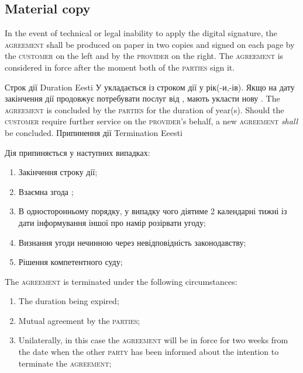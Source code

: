 \begin{Form}
\begin{paracol}{3}
{        \subsection{Material copy}
        In the event of technical or legal inability to apply the digital signature, the \textsc{agreement} shall be produced on paper in two copies and signed on each page by the \textsc{customer} on the left and by the \textsc{provider} on the right. The \textsc{agreement} is considered in force after the moment both of the \textsc{parties} sign it.}
        {}
      \clause
        {Строк дії}
        {Duration}
        {Eesti}
        {У укладається  із строком дії у  рік(-и,-ів). Якщо  на дату закінчення дії  продовжує потребувати послуг від ,  мають укласти нову .}
        {The \textsc{agreement} is concluded by the \textsc{parties} for the duration of  year(s). Should the \textsc{customer} require further service on the \textsc{provider}'s behalf, a new \textsc{agreement} \emph{shall} be concluded.}
        {}
      \clause
        {Припинення дії}
        {Termination}
        {Eeesti}
        {Дія  припиняється у наступних випадках:
        \begin{enumerate}
          \item Закінчення строку дії;
          \item Взаємна згода ;
          \item В односторонньому порядку, у випадку чого  діятиме 2 календарні тижні із дати інформування іншої  про намір розірвати угоду; 
          \item Визнання угоди нечинною через невідповідність законодавству;
          \item Рішення компетентного суду;
        \end{enumerate}}
        {The \textsc{agreement} is terminated under the following circumstances:
        \begin{enumerate}
          \item The duration being expired;
          \item Mutual agreement by the \textsc{parties};
          \item Unilaterally, in this case the \textsc{agreement} will be in force for two weeks from the date when the other \textsc{party} has been informed about the intention to terminate the \textsc{agreement};

\end{enumerate}}
\end{paracol}
\end{Form}
